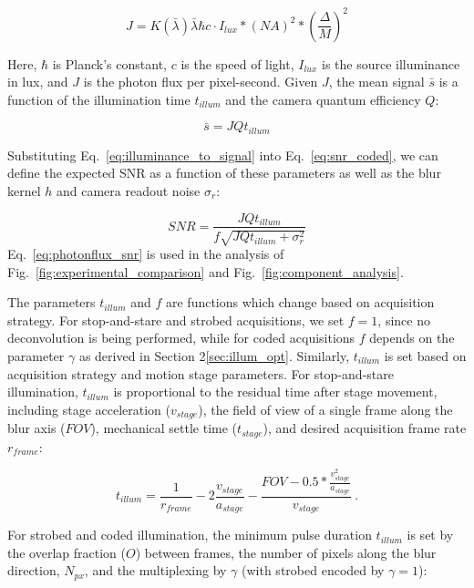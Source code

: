 \begin{equation}
\label{eq:photonflux}
J = K(\bar{\lambda}) \bar{\lambda}\hbar c \cdot I_{lux} * (NA)^2 * (\frac{\Delta}{M})^2
\end{equation}

Here, $\hbar$ is Planck's constant, $c$ is the speed of light, $I_{lux}$ is the source illuminance in lux, and $J$ is the photon flux per pixel-second. Given $J$, the mean signal $\bar{s}$ is a function of the illumination time $t_{illum}$ and the camera quantum efficiency $Q$:

\begin{equation}
\label{eq:illuminance_to_signal}
    \bar{s} = J Q t_{illum}
\end{equation}

Substituting Eq.~\ref{eq:illuminance_to_signal} into Eq.~\ref{eq:snr_coded}, we can define the expected SNR as a function of these parameters as well as the blur kernel $h$ and camera readout noise $\sigma_r$:

\begin{equation}
\label{eq:photonflux_snr}
SNR = \frac{J Q t_{illum}}{f \sqrt{J Q t_{illum} + \sigma_r^2}}
\end{equation}
Eq.~\ref{eq:photonflux_snr} is used in the analysis of Fig.~\ref{fig:experimental_comparison} and Fig.~\ref{fig:component_analysis}.

The parameters $t_{illum}$ and $f$ are functions which change based on acquisition strategy.
For stop-and-stare and strobed acquisitions, we set $f = 1$, since no deconvolution is being performed, while for coded acquisitions $f$ depends on the parameter $\gamma$ as derived in Section 2\ref{sec:illum_opt}.
Similarly, $t_{illum}$ is set based on acquisition strategy and motion stage parameters. For stop-and-stare illumination, $t_{illum}$ is proportional to the residual time after stage movement, including stage acceleration ($v_{stage}$), the field of view of a single frame along the blur axis ($FOV$), mechanical settle time ($t_{stage}$), and desired acquisition frame rate $r_{frame}$:

\begin{equation}
\label{eq:sns_illum}
t_{illum} = \frac{1}{r_{frame}} - 2\frac{v_{stage}}{a_{stage}} - \frac{FOV - 0.5 * \frac{v_{stage}^2}{a_{stage}}}{v_{stage}}\:.
\end{equation}

For strobed and coded illumination, the minimum pulse duration $t_{illum}$ is set by the overlap fraction ($O$) between frames, the number of pixels along the blur direction, $N_{px}$, and the multiplexing by $\gamma$ (with strobed encoded by $\gamma=1$):

